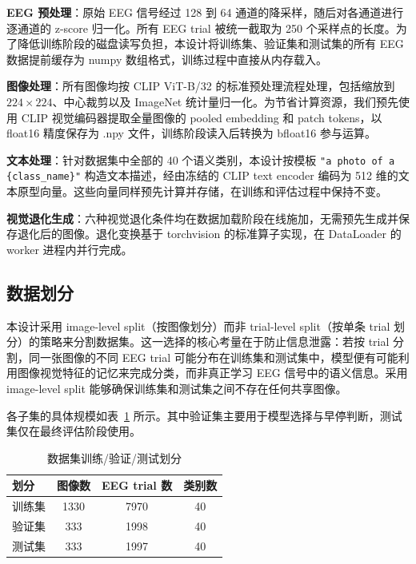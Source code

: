 \textbf{EEG 预处理}：原始 EEG 信号经过 128 到 64 通道的降采样，随后对各通道进行逐通道的 z-score 归一化。所有 EEG trial 被统一截取为 250 个采样点的长度。为了降低训练阶段的磁盘读写负担，本设计将训练集、验证集和测试集的所有 EEG 数据提前缓存为 numpy 数组格式，训练过程中直接从内存载入。

\textbf{图像处理}：所有图像均按 CLIP ViT-B/32 的标准预处理流程处理，包括缩放到 $224\times224$、中心裁剪以及 ImageNet 统计量归一化。为节省计算资源，我们预先使用 CLIP 视觉编码器提取全量图像的 pooled embedding 和 patch tokens，以 float16 精度保存为 .npy 文件，训练阶段读入后转换为 bfloat16 参与运算。

\textbf{文本处理}：针对数据集中全部的 40 个语义类别，本设计按模板 \texttt{"a photo of a \{class\_name\}"} 构造文本描述，经由冻结的 CLIP text encoder 编码为 512 维的文本原型向量。这些向量同样预先计算并存储，在训练和评估过程中保持不变。

\textbf{视觉退化生成}：六种视觉退化条件均在数据加载阶段在线施加，无需预先生成并保存退化后的图像。退化变换基于 torchvision 的标准算子实现，在 DataLoader 的 worker 进程内并行完成。

\subsection{数据划分}

本设计采用 image-level split（按图像划分）而非 trial-level split（按单条 trial 划分）的策略来分割数据集。这一选择的核心考量在于防止信息泄露：若按 trial 分割，同一张图像的不同 EEG trial 可能分布在训练集和测试集中，模型便有可能利用图像视觉特征的记忆来完成分类，而非真正学习 EEG 信号中的语义信息。采用 image-level split 能够确保训练集和测试集之间不存在任何共享图像。

各子集的具体规模如表~\ref{tab:split} 所示。其中验证集主要用于模型选择与早停判断，测试集仅在最终评估阶段使用。

\begin{table}[htbp]
  \centering
  \caption{数据集训练/验证/测试划分}
  \label{tab:split}
  \begin{tabular}{l c c c}
    \toprule
    划分 & 图像数 & EEG trial 数 & 类别数 \\
    \midrule
    训练集 & 1330 & 7970 & 40 \\
    验证集 & 333 & 1998 & 40 \\
    测试集 & 333 & 1997 & 40 \\
    \bottomrule
  \end{tabular}
\end{table}

